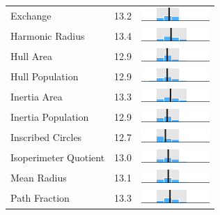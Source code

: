 \begin{table}
\begin{tabular}{l rm{7em}}
Exchange               &  13.2 &     \includegraphics[width=7em]{mini_hist/FL_2008_exchange} \\
Harmonic Radius        &  13.4 &  \includegraphics[width=7em]{mini_hist/FL_2008_harm_radius} \\
Hull Area              &  12.9 &       \includegraphics[width=7em]{mini_hist/FL_2008_hull_a} \\
Hull Population        &  12.9 &       \includegraphics[width=7em]{mini_hist/FL_2008_hull_p} \\
Inertia Area           &  13.3 &    \includegraphics[width=7em]{mini_hist/FL_2008_inertia_a} \\
Inertia Population     &  12.9 &    \includegraphics[width=7em]{mini_hist/FL_2008_inertia_p} \\
Inscribed Circles      &  12.7 &    \includegraphics[width=7em]{mini_hist/FL_2008_ehrenburg} \\
Isoperimeter Quotient  &  13.0 &       \includegraphics[width=7em]{mini_hist/FL_2008_polsby} \\
Mean Radius            &  13.1 &  \includegraphics[width=7em]{mini_hist/FL_2008_mean_radius} \\
Path Fraction          &  13.3 &    \includegraphics[width=7em]{mini_hist/FL_2008_path_frac} \\

\end{tabular}
\end{table}
